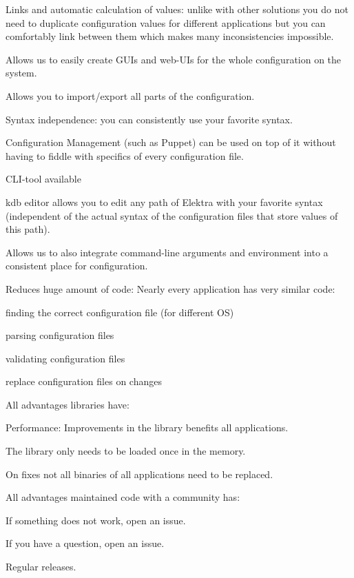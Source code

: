 \begin{DoxyItemize}
\item Links and automatic calculation of values\+: unlike with other solutions you do not need to duplicate configuration values for different applications but you can comfortably link between them which makes many inconsistencies impossible.
\item Allows us to easily create G\+U\+Is and web-\/\+U\+Is for the whole configuration on the system.
\item Allows you to import/export all parts of the configuration.
\item Syntax independence\+: you can consistently use your favorite syntax.
\item Configuration Management (such as Puppet) can be used on top of it without having to fiddle with specifics of every configuration file.
\item C\+L\+I-\/tool available
\item {\ttfamily kdb editor} allows you to edit any path of Elektra with your favorite syntax (independent of the actual syntax of the configuration files that store values of this path).
\item Allows us to also integrate command-\/line arguments and environment into a consistent place for configuration.
\item Reduces huge amount of code\+: Nearly every application has very similar code\+:
\begin{DoxyItemize}
\item finding the correct configuration file (for different OS)
\item parsing configuration files
\item validating configuration files
\item replace configuration files on changes
\end{DoxyItemize}
\item All advantages libraries have\+:
\begin{DoxyItemize}
\item Performance\+: Improvements in the library benefits all applications.
\item The library only needs to be loaded once in the memory.
\item On fixes not all binaries of all applications need to be replaced.
\end{DoxyItemize}
\item All advantages maintained code with a community has\+:
\begin{DoxyItemize}
\item If something does not work, open an issue.
\item If you have a question, open an issue.
\item Regular releases.
\end{DoxyItemize}
\end{DoxyItemize}


